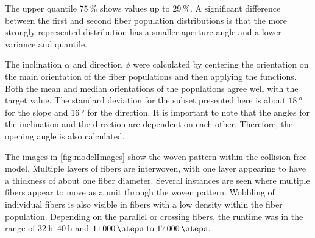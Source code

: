 The upper quantile $\SI{75}{\percent}$ shows values up to $\SI{29}{\percent}$.
A significant difference between the first and second fiber population distributions is that the more strongly represented distribution has a smaller aperture angle and a lower variance and quantile.
\par
% 
The inclination $\alpha$ and direction $\phi$ were calculated by centering the orientation on the main orientation of the fiber populations and then applying the functions.
Both the mean and median orientations of the populations agree well with the target value.
The standard deviation for the subset presented here is about $\SI{18}{\degree}$ for the slope and $\SI{16}{\degree}$  for the direction.
It is important to note that the angles for the inclination and the direction are dependent on each other.
Therefore, the opening angle is also calculated.
\par
%
The images in \cref{fig:modelImages} show the woven pattern within the collision-free model.
Multiple layers of fibers are interwoven, with one layer appearing to have a thickness of about one fiber diameter.
Several instances are seen where multiple fibers appear to move as a unit through the woven pattern.
Wobbling of individual fibers is also visible in fibers with a low density within the fiber population.
Depending on the parallel or crossing fibers, the runtime was in the range of $\SIrange{32}{40}{\hour}$ and $\SIrange{11000}{17000}{\steps}$.
%
% 
% 
